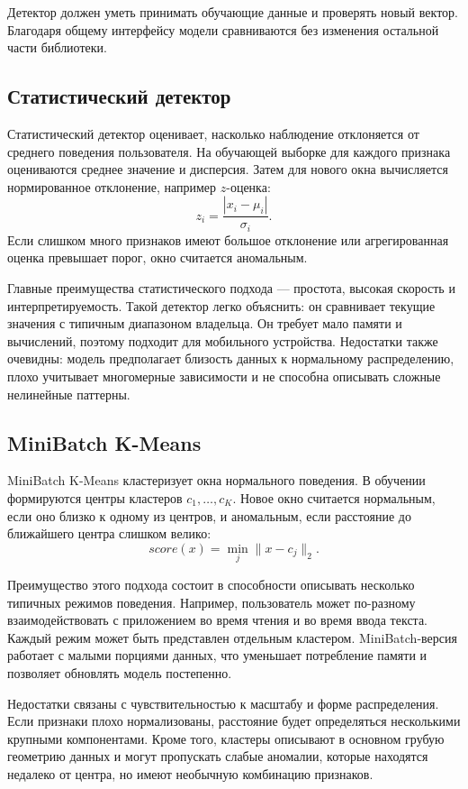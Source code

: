\documentclass[oneside,senior,etd]{BYUPhys}
\begin{document}
Детектор должен уметь принимать обучающие данные и проверять новый вектор. Благодаря общему интерфейсу модели сравниваются без изменения остальной части библиотеки.

\subsection{Статистический детектор}

Статистический детектор оценивает, насколько наблюдение отклоняется от среднего поведения пользователя. На обучающей выборке для каждого признака оцениваются среднее значение и дисперсия. Затем для нового окна вычисляется нормированное отклонение, например $z$-оценка:
\[
    z_i = \frac{|x_i-\mu_i|}{\sigma_i}.
\]
Если слишком много признаков имеют большое отклонение или агрегированная оценка превышает порог, окно считается аномальным.

Главные преимущества статистического подхода --- простота, высокая скорость и интерпретируемость. Такой детектор легко объяснить: он сравнивает текущие значения с типичным диапазоном владельца. Он требует мало памяти и вычислений, поэтому подходит для мобильного устройства. Недостатки также очевидны: модель предполагает близость данных к нормальному распределению, плохо учитывает многомерные зависимости и не способна описывать сложные нелинейные паттерны.

\subsection{MiniBatch K-Means}

MiniBatch K-Means кластеризует окна нормального поведения. В обучении формируются центры кластеров $c_1,\ldots,c_K$. Новое окно считается нормальным, если оно близко к одному из центров, и аномальным, если расстояние до ближайшего центра слишком велико:
\[
    score(x)=\min_j \|x-c_j\|_2.
\]

Преимущество этого подхода состоит в способности описывать несколько типичных режимов поведения. Например, пользователь может по-разному взаимодействовать с приложением во время чтения и во время ввода текста. Каждый режим может быть представлен отдельным кластером. MiniBatch-версия работает с малыми порциями данных, что уменьшает потребление памяти и позволяет обновлять модель постепенно.

Недостатки связаны с чувствительностью к масштабу и форме распределения. Если признаки плохо нормализованы, расстояние будет определяться несколькими крупными компонентами. Кроме того, кластеры описывают в основном грубую геометрию данных и могут пропускать слабые аномалии, которые находятся недалеко от центра, но имеют необычную комбинацию признаков.
\end{document}
